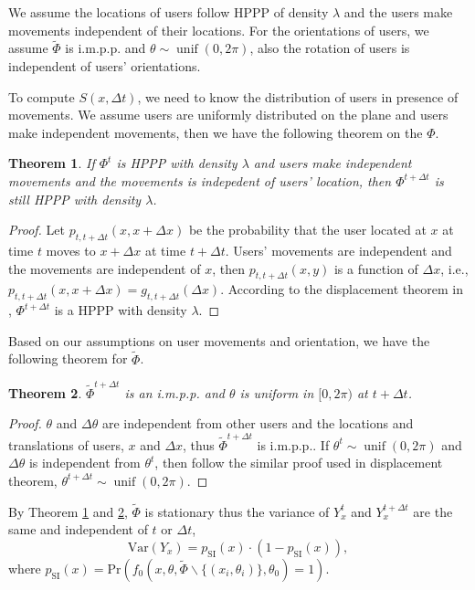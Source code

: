 \documentclass[10pt, conference, letterpaper]{IEEEtran}
\newtheorem{theorem}{Theorem}
\DeclareMathOperator*{\unif}{unif}
\begin{document}
We assume the locations of users follow HPPP of density $\lambda$ and the users make movements independent of their locations. For the orientations of users, we assume $\tilde{\Phi}$ is i.m.p.p. and $\theta \sim \unif(0,2\pi)$, also the rotation of users is independent of users' orientations. 

To compute $S(x, \Delta t)$, we need to know the distribution of users in presence of movements. We assume users are uniformly distributed on the plane and users make independent movements, then we have the following theorem on the $\Phi$.

\begin{theorem}\label{theorem:hppp}
If $\Phi^t$ is HPPP with density $\lambda$ and users make independent movements and the movements is indepedent of users' location, then $\Phi^{t+\Delta t}$ is still HPPP with density $\lambda$. 
\end{theorem} 
\begin{proof}
Let $p_{t, t+\Delta t}(x, x+\Delta x)$ be the probability that the user located at $x$ at time $t$ moves to $x + \Delta x$ at time $t+\Delta t$. Users' movements are independent and the movements are independent of $x$, then $p_{t, t+\Delta t}(x, y)$ is a function of $\Delta x$, i.e., $p_{t, t+\Delta t}(x, x+\Delta x) = g_{t, t+\Delta t}(\Delta x)$.
According to the displacement theorem in \cite{poisson}, $\Phi^{t+\Delta t}$ is a HPPP with density $\lambda$.
\end{proof}

Based on our assumptions on user movements and orientation, we have the following theorem for $\tilde{\Phi}$. 

\begin{theorem}\label{theorem:hppp_orientation}
$\tilde{\Phi}^{t+\Delta t}$ is an i.m.p.p. and $\theta$ is uniform in $[0, 2\pi)$ at $t+ \Delta t$. 
\end{theorem}
\begin{proof}
	$\theta$ and $\Delta \theta$ are independent from other users and the locations and translations of users, $x$ and $\Delta x$, thus $\tilde{\Phi}^{t+\Delta t}$ is i.m.p.p.. If $\theta^t\sim \unif(0, 2\pi)$ and $\Delta \theta$ is independent from $\theta^t$, then follow the similar proof used in displacement theorem, $\theta^{t + \Delta t}\sim \unif(0, 2\pi)$. 
\end{proof}

By Theorem \ref{theorem:hppp} and \ref{theorem:hppp_orientation}, $\tilde{\Phi}$ is stationary thus the variance of $Y_x^t$ and $Y_x^{t+\Delta t}$ are the same and independent of $t$ or $\Delta t$, 
\begin{equation*}
\mathrm{Var}(Y_x)=p_{\mathrm{SI}}(x)\cdot (1-p_{\mathrm{SI}}(x)),
\end{equation*}
where $p_{\mathrm{SI}}(x)=\mathrm{Pr}(f_0(x,\theta,\tilde{\Phi}\backslash\{(x_i,\theta_i)\}, \theta_0)=1)$. 
\end{document}
